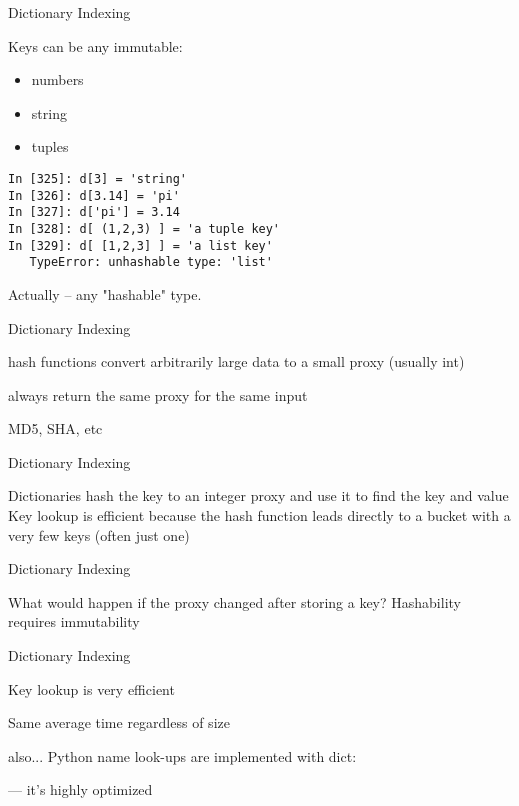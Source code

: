 \documentclass{beamer}
\begin{document}
\begin{frame}[fragile]{Dictionary Indexing}

{\Large Keys can be any immutable:}
\begin{itemize}
  \item numbers
  \item string
  \item tuples
\end{itemize}

\begin{verbatim}
In [325]: d[3] = 'string'
In [326]: d[3.14] = 'pi'
In [327]: d['pi'] = 3.14
In [328]: d[ (1,2,3) ] = 'a tuple key'
In [329]: d[ [1,2,3] ] = 'a list key'
   TypeError: unhashable type: 'list'
\end{verbatim}

\vfill
Actually -- any "hashable" type.
\end{frame} 

\begin{frame}[fragile]{Dictionary Indexing}

\vfill
{\Large hash functions convert arbitrarily large data to a small proxy (usually int)

\vfill
always return the same proxy for the same input

\vfill
MD5, SHA, etc
\vfill
}
\end{frame} 

\begin{frame}[fragile]{Dictionary Indexing}

\vfill
{\Large
Dictionaries hash the key to an integer proxy and use it to find the key and value
}
\vfill
{\Large
Key lookup is efficient because the hash function leads directly to a bucket with a very few keys (often just one)
}
\vfill
\end{frame} 

\begin{frame}[fragile]{Dictionary Indexing}

\vfill
{\Large
What would happen if the proxy changed after storing a key?
}
\vfill
{\Large
Hashability requires immutability}
\vfill
\end{frame} 

\begin{frame}[fragile]{Dictionary Indexing}

\vfill
{\Large

Key lookup is very efficient

\vfill
Same average time regardless of size
}

\vfill
also... Python name look-ups are implemented with dict:

 --- it’s highly optimized
\end{frame} 
\end{document}
